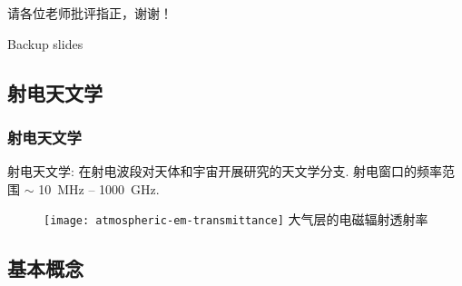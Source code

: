 \documentclass{beamer}
\begin{document}
\begin{frame}[standout]
  \huge 请各位老师批评指正，谢谢！
\end{frame}


\appendix

\begin{frame}[standout]
  Backup slides
\end{frame}

\subsection{射电天文学}

\begin{frame}[subsec]
  \frametitle{射电天文学}
  \alert{射电天文学}:
  在射电波段对天体和宇宙开展研究的天文学分支.
  \alert{射电窗口}的频率范围 $\sim$ \SI{10}{\MHz} -- \SI{1000}{\GHz}.

  \begin{figure}
    \centering\footnotesize
    \texttt{[image: atmospheric-em-transmittance]}
    大气层的电磁辐射透射率
  \end{figure}

  \vspace*{0.5em}
\end{frame}

\subsection{基本概念}
\end{document}
